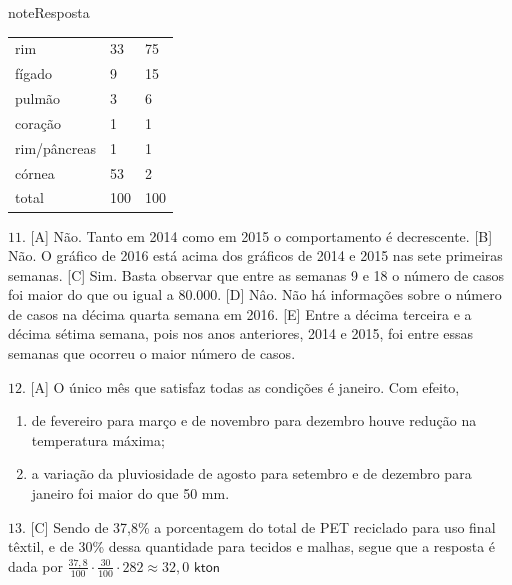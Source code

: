\begin{sphinxadmonition}{note}{Resposta}
\begin{description}
\begin{description}
\begin{savenotes}\sphinxattablestart
\centering
\begin{tabulary}{\linewidth}[t]{|T|T|T|}
\hline
{}\relax &\relax &\relax \\
\hline
rim
&
33
&
75
\\
\hline
fígado
&
9
&
15
\\
\hline
pulmão
&
3
&
6
\\
\hline
coração
&
1
&
1
\\
\hline
rim/pâncreas
&
1
&
1
\\
\hline
córnea
&
53
&
2
\\
\hline
total
&
100
&
100
\\
\hline
\end{tabulary}
\par
\sphinxattableend\end{savenotes}

\(11.\) {[}A{]} Não. Tanto em 2014 como em 2015 o comportamento é decrescente. {[}B{]} Não. O gráfico de 2016 está acima dos gráficos de 2014 e 2015 nas sete primeiras semanas. {[}C{]} Sim. Basta observar que entre as semanas 9 e 18 o número de casos foi maior do que ou igual a 80.000. {[}D{]} Nâo. Não há informações sobre o número de casos na décima quarta semana em 2016. {[}E{]} Entre a décima terceira e a décima sétima semana, pois nos anos anteriores, 2014 e 2015, foi entre essas semanas que ocorreu o maior número de casos.

\(12.\) {[}A{]} O único mês que satisfaz todas as condições é janeiro. Com efeito,

\end{description}

\end{description}
\begin{enumerate}
\item {} 
de fevereiro para março e de novembro para dezembro houve redução na temperatura máxima;

\item {} 
a variação da pluviosidade de agosto para setembro e de dezembro para janeiro foi maior do que  50 mm.

\end{enumerate}

\(13.\) {[}C{]} Sendo de 37,8\%  a porcentagem do total de PET reciclado para uso final têxtil, e de 30\%  dessa quantidade para tecidos e malhas, segue que a resposta é dada por \(\frac{37,8}{100}\cdot \frac{30}{100}\cdot 282 \approx 32,0 \textsf{ kton}\)


\end{sphinxadmonition}
